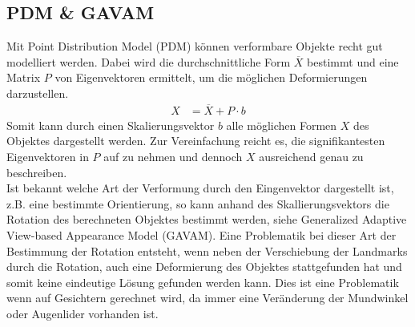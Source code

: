 \subsection{PDM \& GAVAM}
Mit Point Distribution Model (PDM) können verformbare Objekte recht gut modelliert werden. Dabei wird die durchschnittliche Form $\overline{X}$ bestimmt und eine Matrix $P$ von Eigenvektoren ermittelt, um die möglichen Deformierungen darzustellen.
\begin{align*}
X &= \overline{X}+P\cdot b
\end{align*}
Somit kann durch einen Skalierungsvektor $b$ alle möglichen Formen $X$ des Objektes dargestellt werden. Zur Vereinfachung reicht es, die signifikantesten Eigenvektoren in $P$ auf zu nehmen und dennoch $X$ ausreichend genau zu beschreiben.\\
Ist bekannt welche Art der Verformung durch den Eingenvektor dargestellt ist, z.B. eine bestimmte Orientierung, so kann anhand des Skallierungsvektors die Rotation des berechneten Objektes bestimmt werden, siehe Generalized Adaptive View-based Appearance Model (GAVAM). Eine Problematik bei dieser Art der Bestimmung der Rotation entsteht, wenn neben der Verschiebung der Landmarks durch die Rotation, auch eine Deformierung des Objektes stattgefunden hat und somit keine eindeutige Lösung gefunden werden kann. Dies ist eine Problematik wenn auf Gesichtern gerechnet wird, da immer eine Veränderung der Mundwinkel oder Augenlider vorhanden ist.\\
\cite{wiki_PDM}\cite{pdf_PDM}\cite{pdf_GAVAM}